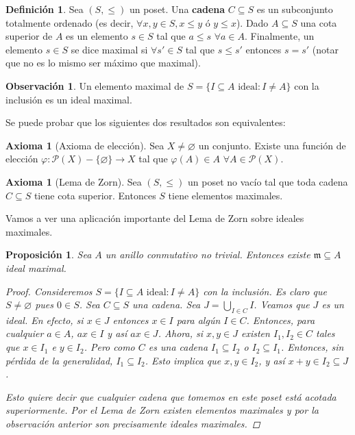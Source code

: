 \documentclass[12pt]{book}
\newtheorem{prop}[teo]{Proposición}
\theoremstyle{definition}
\newtheorem{obs}[teo]{Observación}
\newtheorem{defn}[teo]{Definición}
\newtheorem{ax}[teo]{Axioma}
\let\emptyset\varnothing
\begin{document}
\begin{defn}
Sea $(S,\leq)$ un poset. Una \textbf{cadena} $C\subseteq S$ es un subconjunto totalmente ordenado (es decir, $\forall x,y\in S, x\leq y$ ó $y\leq x$). Dado $A\subseteq S$ una cota superior de $A$ es un elemento $s\in S$ tal que $a\leq s$ $\forall a\in A$. Finalmente, un elemento $s\in S$ se dice maximal si $\forall s'\in S$ tal que $s\leq s'$ entonces $s=s'$ (notar que no es lo mismo ser máximo que maximal).
\end{defn}

\begin{obs}
Un elemento maximal de $S=\{I\subseteq A \text{ ideal} : I\neq A\}$ con la inclusión es un ideal maximal.
\end{obs}

Se puede probar que los siguientes dos resultados son equivalentes:

\begin{ax}[Axioma de elección]
Sea $X\neq \emptyset$ un conjunto. Existe una función de elección $\varphi:\mathcal{P}(X)-\{\emptyset\}\to X$ tal que $\varphi(A)\in A$ $\forall A\in\mathcal{P}(X)$. 
\end{ax}
\begin{ax}[Lema de Zorn]
Sea $(S,\leq)$ un poset no vacío tal que toda cadena $C\subseteq S$ tiene cota superior. Entonces $S$ tiene elementos maximales.
\end{ax}

Vamos a ver una aplicación importante del Lema de Zorn sobre ideales maximales.

\begin{prop}
Sea $A$ un anillo conmutativo no trivial. Entonces existe $\mathfrak{m}\subseteq A$ ideal maximal.
\begin{proof}

Consideremos $S=\{I\subseteq A \text{ ideal}:I\neq A\}$ con la inclusión. Es claro que $S\neq \emptyset$ pues $0\in S$. Sea $C\subseteq S$ una cadena. Sea $J=\displaystyle\bigcup_{I\in C} I $. Veamos que $J$ es un ideal. En efecto, si $x\in J$ entonces $x\in I$ para algún $I\in C$. Entonces, para cualquier $a\in A$, $ax\in I$ y así $ax\in J$. Ahora, si $x,y\in J$ existen $I_1,I_2\in C$ tales que $x\in I_1$ e $y\in I_2$. Pero como $C$ es una cadena $I_1\subseteq I_2$ o $I_2\subseteq I_1$. Entonces, sin pérdida de la generalidad, $I_1\subseteq I_2$. Esto implica que $x,y\in I_2$, y así $x+y\in I_2\subseteq J$.

Esto quiere decir que cualquier cadena que tomemos en este poset está acotada superiormente. Por el Lema de Zorn existen elementos maximales y por la observación anterior son precisamente ideales maximales.

\end{proof}
\end{prop}
\end{document}
